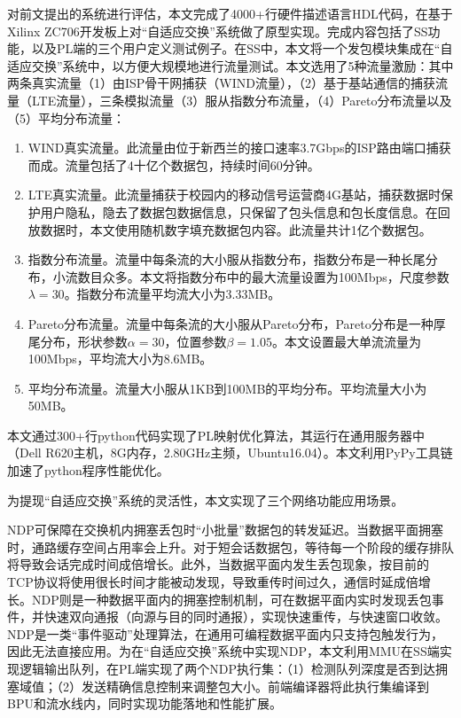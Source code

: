 \label{spe4}

对前文提出的系统进行评估，本文完成了4000+行硬件描述语言HDL代码，在基于Xilinx ZC706开发板上对“自适应交换”系统做了原型实现。完成内容包括了SS功能，以及PL端的三个用户定义测试例子。在SS中，本文将一个发包模块集成在“自适应交换”系统中，以方便大规模地进行流量测试。本文选用了5种流量激励：其中两条真实流量（1）由ISP骨干网捕获（WIND流量），（2）基于基站通信的捕获流量（LTE流量），三条模拟流量（3）服从指数分布流量，（4）Pareto分布流量以及（5）平均分布流量：

\begin{enumerate}
	\item WIND真实流量。此流量由位于新西兰的接口速率3.7Gbps的ISP路由端口捕获而成。流量包括了4十亿个数据包，持续时间60分钟。
	\item LTE真实流量。此流量捕获于校园内的移动信号运营商4G基站，捕获数据时保护用户隐私，隐去了数据包数据信息，只保留了包头信息和包长度信息。在回放数据时，本文使用随机数字填充数据包内容。此流量共计1亿个数据包。
	\item 指数分布流量。流量中每条流的大小服从指数分布，指数分布是一种长尾分布，小流数目众多。本文将指数分布中的最大流量设置为100Mbps，尺度参数$\lambda=30$。指数分布流量平均流大小为3.33MB。
	\item Pareto分布流量。流量中每条流的大小服从Pareto分布，Pareto分布是一种厚尾分布，形状参数$\alpha=30$，位置参数$\beta=1.05$。本文设置最大单流流量为100Mbps，平均流大小为8.6MB。
	\item 平均分布流量。流量大小服从1KB到100MB的平均分布。平均流量大小为50MB。
\end{enumerate}

本文通过300+行python代码实现了PL映射优化算法，其运行在通用服务器中（Dell R620主机，8G内存，2.80GHz主频，Ubuntu16.04）。本文利用PyPy工具链加速了python程序性能优化。

为提现“自适应交换”系统的灵活性，本文实现了三个网络功能应用场景。

\label{chap471}

NDP可保障在交换机内拥塞丢包时“小批量”数据包的转发延迟。当数据平面拥塞时，通路缓存空间占用率会上升。对于短会话数据包，等待每一个阶段的缓存排队将导致会话完成时间成倍增长。此外，当数据平面内发生丢包现象，按目前的TCP协议将使用很长时间才能被动发现，导致重传时间过久，通信时延成倍增长。NDP则是一种数据平面内的拥塞控制机制，可在数据平面内实时发现丢包事件，并快速双向通报（向源与目的同时通报），实现快速重传，与快速窗口收敛。NDP是一类“事件驱动”处理算法，在通用可编程数据平面内只支持包触发行为，因此无法直接应用。为在“自适应交换”系统中实现NDP，本文利用MMU在SS端实现逻辑输出队列，在PL端实现了两个NDP执行集：（1）检测队列深度是否到达拥塞域值；（2）发送精确信息控制来调整包大小。前端编译器将此执行集编译到BPU和流水线内，同时实现功能落地和性能扩展。

